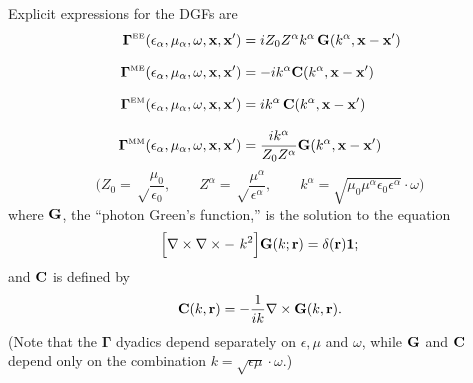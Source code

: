 \documentclass[dvips,letterpaper]{article}
\newcommand{\BG}{\boldsymbol{\Gamma}}
\begin{document}
Explicit expressions for the DGFs are 
\begin{align*}
\BG\supt{EE}(\epsilon_\alpha, \mu_\alpha, \omega, \vb x, \vb x^\prime)
&=
 iZ_0 Z^\alpha k^\alpha \, \vb G(k^\alpha, \vb x-\vb x^\prime)
\\[8pt]
\BG\supt{ME}(\epsilon_\alpha, \mu_\alpha, \omega, \vb x, \vb x^\prime)
&=
 -ik^\alpha \vb C(k^\alpha, \vb x-\vb x^\prime)
\\[8pt]
\BG\supt{EM}(\epsilon_\alpha, \mu_\alpha, \omega, \vb x, \vb x^\prime)
&=
 ik^\alpha \, \vb C(k^\alpha, \vb x-\vb x^\prime)
\\[8pt]
\BG\supt{MM}(\epsilon_\alpha, \mu_\alpha, \omega, \vb x, \vb x^\prime)
&= \frac{ik^\alpha}{Z_0 Z^\alpha} \vb G(k^\alpha, \vb x-\vb x^\prime)
\end{align*}
$$\bigg(Z_0=\sqrt\frac{\mu_0}{\epsilon_0},
        \qquad
        Z^\alpha=\sqrt\frac{\mu^\alpha}{\epsilon^\alpha}, 
         \qquad
        k^\alpha=\sqrt{\mu_0 \mu^\alpha \epsilon_0 \epsilon^\alpha}\cdot \omega
  \bigg)
$$
where $\mathbf{G}$, the ``photon Green's function,''
is the solution to the equation
\begin{equation}
 \Big[\nabla \times \nabla\times - \,\,k^2 \Big]\mathbf{G}(k; \mathbf{r})
 =\delta(\mathbf{r})\mathbf{1};
 \label{DyadicGFG}
\end{equation}
and $\mathbf{C}$ is defined by  
\begin{equation}
  \mathbf{C}(k, \mathbf{r}) = -\frac{1}{ik} \nabla \times \mathbf{G}(k, \mathbf{r}).
 \label{DyadicGFC}
\end{equation}
%
(Note that the $\BG$ dyadics depend separately on $\epsilon,\mu$ 
and $\omega$, while $\mathbf{G}$ and $\mathbf{C}$ depend only on the 
combination $k=\sqrt{\epsilon\mu}\cdot \omega.$)
\end{document}
